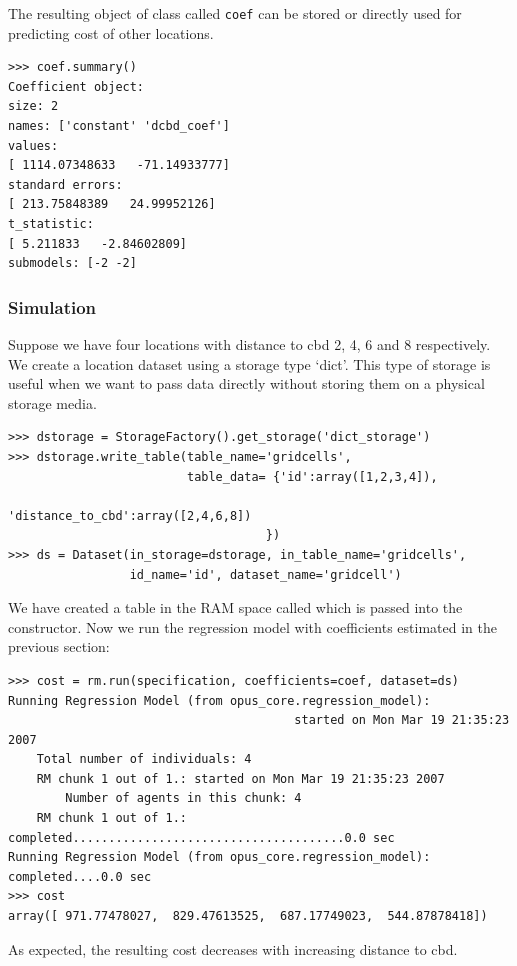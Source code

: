 The resulting object of class  called \verb|coef| can be stored or
directly used for predicting cost of other locations.

\begin{verbatim}
>>> coef.summary()
Coefficient object:
size: 2
names: ['constant' 'dcbd_coef']
values:
[ 1114.07348633   -71.14933777]
standard errors:
[ 213.75848389   24.99952126]
t_statistic:
[ 5.211833   -2.84602809]
submodels: [-2 -2]
\end{verbatim}

%
\subsubsection{Simulation}
%
Suppose we have four locations with distance to cbd 2, 4, 6 and 8
respectively. We create a location dataset using
a storage type `dict'.
This type of storage is useful when we want to pass data directly without storing them on a physical storage media.

\begin{verbatim}
>>> dstorage = StorageFactory().get_storage('dict_storage')
>>> dstorage.write_table(table_name='gridcells',
                         table_data= {'id':array([1,2,3,4]),
                                      'distance_to_cbd':array([2,4,6,8])
                                    })
>>> ds = Dataset(in_storage=dstorage, in_table_name='gridcells',
                 id_name='id', dataset_name='gridcell')
\end{verbatim}
We have created a table in the RAM space called  which is passed into the  constructor.
Now we run the regression model with coefficients estimated in the previous
section:
 
\begin{verbatim}
>>> cost = rm.run(specification, coefficients=coef, dataset=ds)
Running Regression Model (from opus_core.regression_model):
                                        started on Mon Mar 19 21:35:23 2007
    Total number of individuals: 4
    RM chunk 1 out of 1.: started on Mon Mar 19 21:35:23 2007
        Number of agents in this chunk: 4
    RM chunk 1 out of 1.: completed......................................0.0 sec
Running Regression Model (from opus_core.regression_model): completed....0.0 sec
>>> cost
array([ 971.77478027,  829.47613525,  687.17749023,  544.87878418])
\end{verbatim}
As expected, the resulting cost decreases with increasing distance to cbd.

